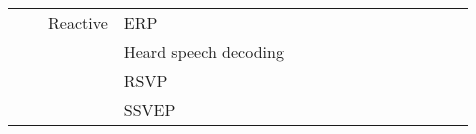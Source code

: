 \begin{tabular}{p{1.5cm}p{1.5cm}p{1.5cm}p{1.5cm}p{0.6cm}p{0.6cm}p{0.6cm}p{0.6cm}p{0.6cm}p{0.6cm}p{0.6cm}p{0.6cm}p{0.6cm}p{0.6cm}p{0.6cm}}
                                &                 & Reactive & ERP &                                                             &                                                                       \cite{Yoon2018, Volker2018, Behncke2017, Cecotti2011} &                                                                        &                                      &                                                            &                      &                         &                               &                     &                         &                                                                      \\
                                &                 &                   & Heard speech decoding &                                                             &                                                                                                                             &                                                                        &                                      &                                                            &                      &                         &                               &                     &                         &                                                \cite{Moinnereau2018} \\
                                &                 &                   & RSVP &                                                             &                                         \cite{Parekh2018, Zafar2017, Hajinoroozi2017, Shamwell2016, Manor2015, Cecotti2014} &                                                  \cite{Spampinato2017} &                                      &                                                            &                      &                         &                               &                     &                         &                                                                      \\
                                &                 &                   & SSVEP &                                    \cite{Perez-Benitez2018} &                                                                                   \cite{Aznan2018, Waytowich2018, kwak2017} &                                                                        &                                      &                                                            &                      &                         &                               &                     &                         &                                                                      \\

\end{tabular}
